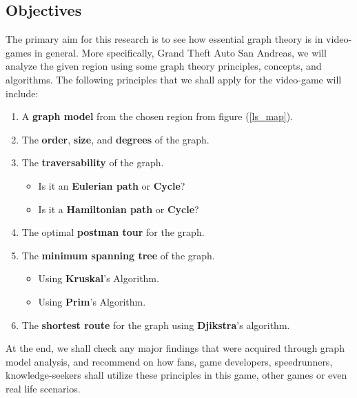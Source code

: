 \documentclass{article}
\begin{document}
	\fi
	
	\subsection*{Objectives}
	The primary aim for this research is to see how essential graph theory is in video-games in general. More specifically, Grand Theft Auto San Andreas, we will analyze the given region using some graph theory principles, concepts, and algorithms. The following principles that we shall apply for the video-game will include:
	\begin{enumerate}
		\item A \textbf{graph model} from the chosen region from figure (\ref{ls_map}).
		\item The \textbf{order}, \textbf{size}, and \textbf{degrees} of the graph.
		\item The \textbf{traversability} of the graph.
			\begin{itemize}
				\item Is it an \textbf{Eulerian path} or \textbf{Cycle}?
				\item Is it a \textbf{Hamiltonian path} or \textbf{Cycle}?
			\end{itemize}
		\item The optimal \textbf{postman tour} for the graph.
		\item The \textbf{minimum spanning tree} of the graph.
			\begin{itemize}
				\item Using \textbf{Kruskal}'s Algorithm.
				\item Using \textbf{Prim}'s Algorithm.
			\end{itemize}
		\item The \textbf{shortest route} for the graph using \textbf{Djikstra}'s algorithm.
	\end{enumerate} At the end, we shall check any major findings that were acquired through graph model analysis, and recommend on how fans, game developers, speedrunners, knowledge-seekers shall utilize these principles in this game, other games or even real life scenarios.   
	
	\ifx\graphTheoryPreambleLoaded
\end{document}
